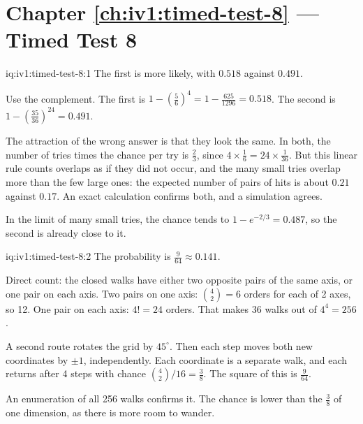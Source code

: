 \section*{Chapter \ref{ch:iv1:timed-test-8} --- Timed Test 8}

\begin{solution}{iq:iv1:timed-test-8:1}
The first is more likely, with $0.518$ against $0.491$.

Use the complement. The first is $1 - (\frac56)^4 = 1 - \frac{625}{1296} = 0.518$. The second is $1 - (\frac{35}{36})^{24} = 0.491$.

The attraction of the wrong answer is that they look the same. In both, the number of tries times the chance per try is $\frac23$, since $4 \times \frac16 = 24 \times \frac{1}{36}$. But this linear rule counts overlaps as if they did not occur, and the many small tries overlap more than the few large ones: the expected number of pairs of hits is about $0.21$ against $0.17$. An exact calculation confirms both, and a simulation agrees.

In the limit of many small tries, the chance tends to $1 - e^{-2/3} = 0.487$, so the second is already close to it.

\end{solution}

\begin{solution}{iq:iv1:timed-test-8:2}
The probability is $\frac{9}{64} \approx 0.141$.

Direct count: the closed walks have either two opposite pairs of the same axis, or one pair on each axis. Two pairs on one axis: $\binom42 = 6$ orders for each of 2 axes, so 12. One pair on each axis: $4! = 24$ orders. That makes 36 walks out of $4^4 = 256$.

A second route rotates the grid by $45^\circ$. Then each step moves both new coordinates by $\pm1$, independently. Each coordinate is a separate walk, and each returns after 4 steps with chance $\binom42/16 = \frac38$. The square of this is $\frac{9}{64}$.

An enumeration of all 256 walks confirms it. The chance is lower than the $\frac38$ of one dimension, as there is more room to wander.

\end{solution}

